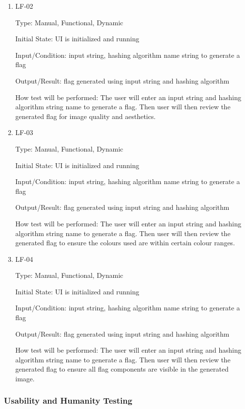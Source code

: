 \documentclass[12pt, titlepage]{article}
\begin{document}
\begin{enumerate}

\item{LF-02\\}

Type: Manual, Functional, Dynamic

Initial State: UI is initialized and running

Input/Condition: input string, hashing algorithm name string to generate a
flag

Output/Result: flag generated using input string and hashing algorithm

How test will be performed: The user will enter an input string and hashing
algorithm string name to generate a flag. Then user will then review the
generated flag for image quality and aesthetics.

\item{LF-03\\}

Type: Manual, Functional, Dynamic

Initial State: UI is initialized and running

Input/Condition: input string, hashing algorithm name string to generate a
flag

Output/Result: flag generated using input string and hashing algorithm

How test will be performed: The user will enter an input string and hashing
algorithm string name to generate a flag. Then user will then review the
generated flag to ensure the colours used are within certain colour ranges.

\item{LF-04\\}

Type: Manual, Functional, Dynamic

Initial State: UI is initialized and running

Input/Condition: input string, hashing algorithm name string to generate a
flag

Output/Result: flag generated using input string and hashing algorithm

How test will be performed: The user will enter an input string and hashing
algorithm string name to generate a flag. Then user will then review the
generated flag to ensure all flag components are visible in the generated
image.

\end{enumerate}

\subsubsection{Usability and Humanity Testing}
\end{document}
